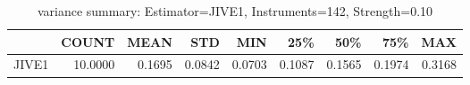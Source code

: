 \begin{table}[ht]
\centering
\caption{variance summary: Estimator=JIVE1, Instruments=142, Strength=0.10}
\begin{tabular}{lrrrrrrrr}
\toprule
 & COUNT & MEAN & STD & MIN & 25\% & 50\% & 75\% & MAX \\
\midrule
JIVE1 & 10.0000 & 0.1695 & 0.0842 & 0.0703 & 0.1087 & 0.1565 & 0.1974 & 0.3168 \\
\bottomrule
\end{tabular}
\end{table}
